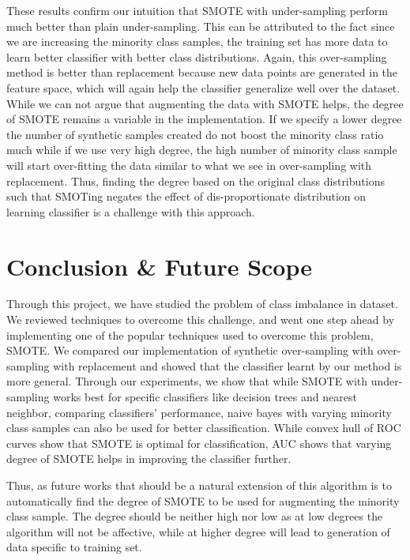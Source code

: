 \documentclass[10pt,journal,compsoc]{IEEEtran}
\begin{document}
These results confirm our intuition that SMOTE with under-sampling perform much better than plain under-sampling.
This can be attributed to the fact since we are increasing the minority class samples, the training set has more data to learn better classifier with better class distributions.
Again, this over-sampling method is better than replacement because new data points are generated in the feature space, which will again help the classifier generalize well over the dataset.
While we can not argue that augmenting the data with SMOTE helps, the degree of SMOTE remains a variable in the implementation.
If we specify a lower degree the number of synthetic samples created do not boost the minority class ratio much while if we use very high degree, the high number of minority class sample will start over-fitting the data similar to what we see in over-sampling with replacement.
Thus, finding the degree based on the original class distributions such that SMOTing negates the effect of dis-proportionate distribution on learning classifier is a challenge with this approach.

\section{Conclusion \& Future Scope}
\label{sec:conclude}
Through this project, we have studied the problem of class imbalance in dataset. 
We reviewed techniques to overcome this challenge, and went one step ahead by implementing one of the popular techniques used to overcome this problem, SMOTE.
We compared our implementation of synthetic over-sampling with over-sampling with replacement and showed that the classifier learnt by our method is more general.
Through our experiments, we show that while SMOTE with under-sampling works best for specific classifiers like decision trees and nearest neighbor, comparing classifiers' performance, naive bayes with varying minority class samples can also be used for better classification.
While convex hull of ROC curves show that SMOTE is optimal for classification, AUC shows that varying degree of SMOTE helps in improving the classifier further. 

Thus, as future works that should be a natural extension of this algorithm is to automatically find the degree of SMOTE to be used for augmenting the minority class sample.
The degree should be neither high nor low as at low degrees the algorithm will not be affective, while at higher degree will lead to generation of data specific to training set.
\end{document}
